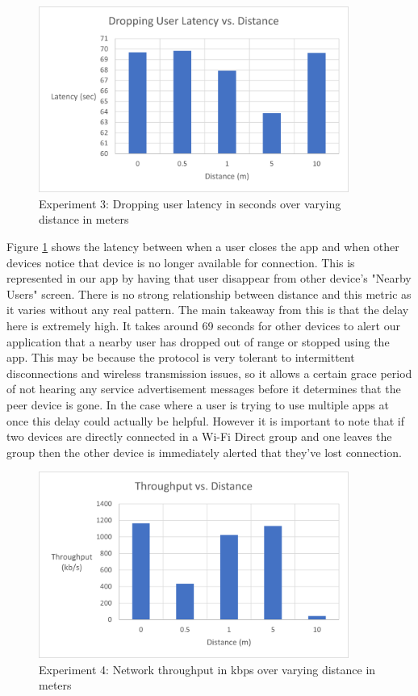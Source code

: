 \documentclass[10pt]{article}
\begin{document}
\begin{figure}[h!]
    \centering
    \includegraphics[width=4in]{dropping_user_latency_graph.png}
    \caption{Experiment 3: Dropping user latency in seconds over varying distance in meters}
    \label{results:dropping_user}
\end{figure}

Figure \ref{results:dropping_user} shows the latency between when a user closes the app and when other devices notice that device is no longer available for connection. This is represented in our app by having that user disappear from other device's "Nearby Users" screen. There is no strong relationship between distance and this metric as it varies without any real pattern. The main takeaway from this is that the delay here is extremely high. It takes around 69 seconds for other devices to alert our application that a nearby user has dropped out of range or stopped using the app. This may be because the protocol is very tolerant to intermittent disconnections and wireless transmission issues, so it allows a certain grace period of not hearing any service advertisement messages before it determines that the peer device is gone. In the case where a user is trying to use multiple apps at once this delay could actually be helpful. However it is important to note that if two devices are directly connected in a Wi-Fi Direct group and one leaves the group then the other device is immediately alerted that they've lost connection.

\begin{figure}[h!]
    \centering
    \includegraphics[width=4in]{throughput_graph.png}
    \caption{Experiment 4: Network throughput in kbps over varying distance in meters}
    \label{results:throughput}
\end{figure}
\end{document}
